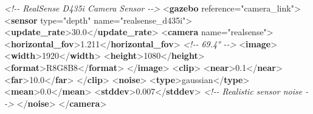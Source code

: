 \documentclass[
]{article}
\newenvironment{Shaded}{\begin{snugshade}}{\end{snugshade}}
\newcommand{\CommentTok}[1]{\textcolor[rgb]{0.56,0.35,0.01}{\textit{#1}}}
\newcommand{\KeywordTok}[1]{\textcolor[rgb]{0.13,0.29,0.53}{\textbf{#1}}}
\newcommand{\NormalTok}[1]{#1}
\newcommand{\OtherTok}[1]{\textcolor[rgb]{0.56,0.35,0.01}{#1}}
\newcommand{\StringTok}[1]{\textcolor[rgb]{0.31,0.60,0.02}{#1}}
\begin{document}
\begin{Shaded}
\begin{Highlighting}[]
  \CommentTok{\textless{}!{-}{-} RealSense D435i Camera Sensor {-}{-}\textgreater{}}
\NormalTok{  \textless{}}\KeywordTok{gazebo}\OtherTok{ reference=}\StringTok{"camera\_link"}\NormalTok{\textgreater{}}
\NormalTok{    \textless{}}\KeywordTok{sensor}\OtherTok{ type=}\StringTok{"depth"}\OtherTok{ name=}\StringTok{"realsense\_d435i"}\NormalTok{\textgreater{}}
\NormalTok{      \textless{}}\KeywordTok{update\_rate}\NormalTok{\textgreater{}30.0\textless{}/}\KeywordTok{update\_rate}\NormalTok{\textgreater{}}
\NormalTok{      \textless{}}\KeywordTok{camera}\OtherTok{ name=}\StringTok{"realsense"}\NormalTok{\textgreater{}}
\NormalTok{        \textless{}}\KeywordTok{horizontal\_fov}\NormalTok{\textgreater{}1.211\textless{}/}\KeywordTok{horizontal\_fov}\NormalTok{\textgreater{}  }\CommentTok{\textless{}!{-}{-} 69.4° {-}{-}\textgreater{}}
\NormalTok{        \textless{}}\KeywordTok{image}\NormalTok{\textgreater{}}
\NormalTok{          \textless{}}\KeywordTok{width}\NormalTok{\textgreater{}1920\textless{}/}\KeywordTok{width}\NormalTok{\textgreater{}}
\NormalTok{          \textless{}}\KeywordTok{height}\NormalTok{\textgreater{}1080\textless{}/}\KeywordTok{height}\NormalTok{\textgreater{}}
\NormalTok{          \textless{}}\KeywordTok{format}\NormalTok{\textgreater{}R8G8B8\textless{}/}\KeywordTok{format}\NormalTok{\textgreater{}}
\NormalTok{        \textless{}/}\KeywordTok{image}\NormalTok{\textgreater{}}
\NormalTok{        \textless{}}\KeywordTok{clip}\NormalTok{\textgreater{}}
\NormalTok{          \textless{}}\KeywordTok{near}\NormalTok{\textgreater{}0.1\textless{}/}\KeywordTok{near}\NormalTok{\textgreater{}}
\NormalTok{          \textless{}}\KeywordTok{far}\NormalTok{\textgreater{}10.0\textless{}/}\KeywordTok{far}\NormalTok{\textgreater{}}
\NormalTok{        \textless{}/}\KeywordTok{clip}\NormalTok{\textgreater{}}
\NormalTok{        \textless{}}\KeywordTok{noise}\NormalTok{\textgreater{}}
\NormalTok{          \textless{}}\KeywordTok{type}\NormalTok{\textgreater{}gaussian\textless{}/}\KeywordTok{type}\NormalTok{\textgreater{}}
\NormalTok{          \textless{}}\KeywordTok{mean}\NormalTok{\textgreater{}0.0\textless{}/}\KeywordTok{mean}\NormalTok{\textgreater{}}
\NormalTok{          \textless{}}\KeywordTok{stddev}\NormalTok{\textgreater{}0.007\textless{}/}\KeywordTok{stddev}\NormalTok{\textgreater{}  }\CommentTok{\textless{}!{-}{-} Realistic sensor noise {-}{-}\textgreater{}}
\NormalTok{        \textless{}/}\KeywordTok{noise}\NormalTok{\textgreater{}}
\NormalTok{      \textless{}/}\KeywordTok{camera}\NormalTok{\textgreater{}}


\end{Highlighting}
\end{Shaded}
\end{document}
